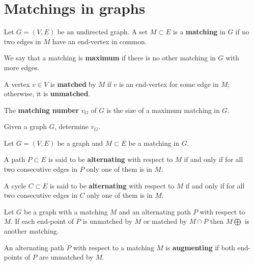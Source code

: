 \chapter{Matchings in graphs}

\begin{definition}[Matching]
    Let $G = (V, E)$ be an undirected graph. 
    A set $M \subset E$ is a \textbf{matching} in $G$ if no two edges in $M$ have an end-vertex in common. 
\end{definition}

We say that a matching is \textbf{maximum} if there is no other matching in $G$ with more edges.

A vertex $v \in V$ is \textbf{matched} by $M$ if $v$ is an end-vertex for some edge in $M$; otherwise, it is \textbf{unmatched}.

The \textbf{matching number} $v_G$ of $G$ is the size of a maximum matching in $G$.

\begin{problem}
    Given a graph $G$, determine $v_G$.
\end{problem}

\begin{definition}
    Let $G = (V, E)$ be a graph and $M \subset E$ be a matching in $G$.

    A path $P \subset E$ is said to be \textbf{alternating} with respect to $M$ if and only if for all two consecutive edges in $P$ only one of them is in $M$.

    A cycle $C \subset E$ is said to be \textbf{alternating} with respect to $M$ if and only if for all two consecutive edges in $C$ only one of them is in $M$.
\end{definition}

\begin{lemma}[]
    Let $G$ be a graph with a matching $M$ and an alternating path $P$ with respect to $M$.
    If each end-point of $P$ is unmatched by $M$ or matched by $M \cap P$ then
    $M \bigoplus$ is another matching. 
\end{lemma}

\begin{definition}
    An alternating path $P$ with respect to a matching $M$ is \textbf{augmenting} if both end-points of $P$ are unmatched by $M$.
\end{definition}

